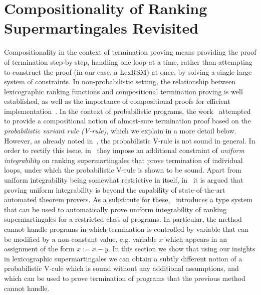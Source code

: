\section{Compositionality of Ranking Supermartingales Revisited}
\label{sec:compositional}

Compositionality in the context of termination proving means providing the 
proof of termination step-by-step, handling one loop at a time, rather than 
attempting to construct the proof (in our case, a LexRSM) at once, by solving a 
single large system of constraints. In non-probabilistic setting, the 
relationship between lexicographic ranking functions and compositional 
termination proving is well established, as well as the importance of 
compositional proofs for efficient implementation~\cite{xxx}. In the context of 
probabilistic programs, the work~\cite{HolgerPOPL} attempted to provide a 
compositional notion of almost-sure termination proof based on the 
\emph{probabilistic variant rule (V-rule),} which we explain in a more detail 
below. 
However, as already noted in~\cite{HolgerPOPL}, the probabilistic V-rule is not 
sound in general. In order to rectify this issue, in~\cite{HolgerPOPL} they 
impose an additional constraint of \emph{uniform integrability} on ranking 
supermartingales that prove termination of individual loops, 
under which the probabilistic V-rule is shown to be sound. Apart from uniform 
integrability being somewhat restrictive in itself, in~\cite{HolgerPOPL} it is 
argued that proving uniform integrability is beyond the capability of 
state-of-the-art automated theorem provers. As a substitute for 
these,~\cite{HolgerPOPL} introduces a type system that can be used to 
automatically prove 
uniform integrability of ranking supermartingales for a restricted class of 
programs. In particular, the method cannot handle programs in which termination 
is controlled by variable that can be modified by a non-constant value, e.g. 
variable $x$ which appears in an assignment of the form $x:=x-y$. In this 
section we show that using our insights in lexicographic supermartingales we 
can obtain a subtly different notion of a probabilistic V-rule which is sound 
without any additional assumptions, and which can be used to prove termination 
of programs that the previous method cannot handle. 
